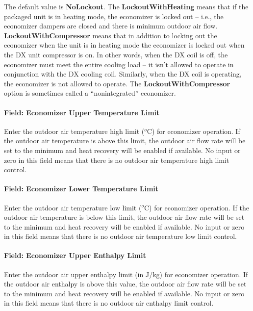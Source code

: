 The default value is \textbf{NoLockout}. The \textbf{LockoutWithHeating} means that if the packaged unit is in heating mode, the economizer is locked out -- i.e., the economizer dampers are closed and there is minimum outdoor air flow. \textbf{LockoutWithCompressor} means that in addition to locking out the economizer when the unit is in heating mode the economizer is locked out when the DX unit compressor is on. In other words, when the DX coil is off, the economizer must meet the entire cooling load -- it isn't allowed to operate in conjunction with the DX cooling coil. Similarly, when the DX coil is operating, the economizer is not allowed to operate. The \textbf{LockoutWithCompressor} option is sometimes called a ``nonintegrated'' economizer.

\paragraph{Field: Economizer Upper Temperature Limit}\label{field-economizer-upper-temperature-limit}

Enter the outdoor air temperature high limit (\(^{o}\)C) for economizer operation. If the outdoor air temperature is above this limit, the outdoor air flow rate will be set to the minimum and heat recovery will be enabled if available. No input or zero in this field means that there is no outdoor air temperature high limit control.

\paragraph{Field: Economizer Lower Temperature Limit}\label{field-economizer-lower-temperature-limit}

Enter the outdoor air temperature low limit (\(^{o}\)C) for economizer operation. If the outdoor air temperature is below this limit, the outdoor air flow rate will be set to the minimum and heat recovery will be enabled if available. No input or zero in this field means that there is no outdoor air temperature low limit control.

\paragraph{Field: Economizer Upper Enthalpy Limit}\label{field-economizer-upper-enthalpy-limit}

Enter the outdoor air upper enthalpy limit (in J/kg) for economizer operation. If the outdoor air enthalpy is above this value, the outdoor air flow rate will be set to the minimum and heat recovery will be enabled if available. No input or zero in this field means that there is no outdoor air enthalpy limit control.

